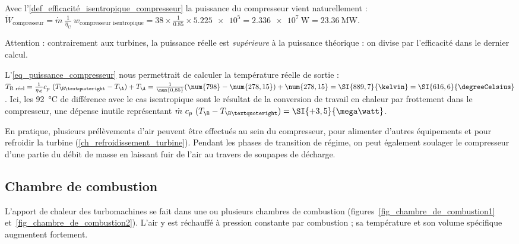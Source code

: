 \begin{anexample}
\begin{answer}
					 Avec l’\cref{def_efficacité_isentropique_compresseur} la puissance du compresseur vient naturellement : $\dot W_\text{compresseur} = \dot m \ \frac{1}{\eta_\text{C}} \ w_\text{compresseur isentropique} = \num{38} \times \frac{1}{\num{0,85}} \times \num{5,225e5} = \SI{2,336e7}{\watt} = \SI{23,36}{\mega\watt}$.
					 	\begin{remark}
					 		Attention : contrairement aux turbines, la puissance réelle est \emph{supérieure} à la puissance théorique : on divise par l’efficacité dans le dernier calcul.
					 	\end{remark}
					 	\begin{remark}
					 		L’\cref{eq_puissance_compresseur} nous permettrait de calculer la température réelle de sortie : $T_\text{B réel} = \frac{1}{\eta_\C} c_p \ (T_{\B’} - T_\A) + T_\A = \frac{1}{\num{0,85}} (\num{798} - \num{278,15}) + \num{278,15} = \SI{889,7}{\kelvin} = \SI{616,6}{\degreeCelsius}$. Ici, les \SI{92}{\degreeCelsius} de différence avec le cas isentropique sont le résultat de la conversion de travail en chaleur par frottement dans le compresseur, une dépense inutile représentant $\dot m \ c_p \ (T_\B - T_{\B’}) = \SI{+3,5}{\mega\watt}$.
					 	\end{remark}
				\end{answer}
		\end{anexample}


		En pratique, plusieurs prélèvements d’air peuvent être effectués au sein du compresseur, pour alimenter d’autres équipements et pour refroidir la turbine (\ref{ch_refroidissement_turbine}). Pendant les phases de transition de régime, on peut également soulager le compresseur d’une partie du débit de masse en laissant fuir de l’air au travers de soupapes de décharge.


	\subsection{Chambre de combustion}

		L’apport de chaleur des turbomachines se fait dans une ou plusieurs chambres de combustion (figures~\ref{fig_chambre_de_combustion1} et~\ref{fig_chambre_de_combustion2}). L’air y est réchauffé à pression constante par combustion ; sa température et son volume spécifique augmentent fortement.

